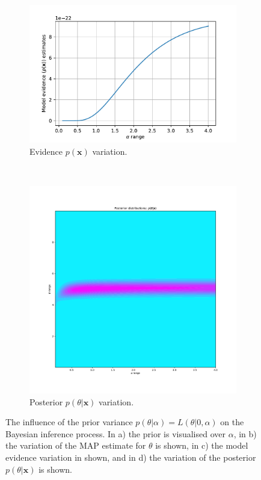\documentclass{article}
\begin{document}
\begin{figure}[htb!]
     \begin{subfigure}[b]{0.45\textwidth}
         \centering
         \includegraphics[width=\textwidth]{Q1a_10.pdf}
         \caption{Evidence $p(\mathbf{x})$ variation.}
     \end{subfigure}
     ~
     \begin{subfigure}[b]{0.45\textwidth}
         \centering
         \includegraphics[width=\textwidth]{Q1a_12.pdf}
         \caption{Posterior $p(\theta \vert \mathbf{x})$ variation.}
     \end{subfigure}
     
     \caption{The influence of the prior variance $p(\theta \vert \alpha) = L(\theta \vert 0, \alpha)$ on the Bayesian inference process. In a) the prior is visualised over $\alpha$, in b) the variation of the MAP estimate for $\theta$ is shown, in c) the model evidence variation in shown, and in d) the variation of the posterior $p(\theta \vert \mathbf{x})$ is shown.}
     \label{fig:Q1a_alpha_variation}
\end{figure}
\end{document}
